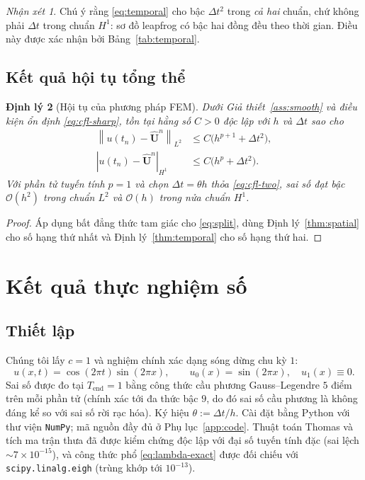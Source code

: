 \documentclass[11pt,a4paper]{article}
\theoremstyle{plain}
\newtheorem{theorem}{Định lý}[section]
\theoremstyle{definition}
\theoremstyle{remark}
\newtheorem{remark}[theorem]{Nhận xét}
\newcommand{\Hone}{H^{1}}
\newcommand{\Ltwo}{L^{2}}
\newcommand{\dt}{\Delta t}
\newcommand{\norm}[1]{\left\lVert #1 \right\rVert}
\newcommand{\seminorm}[1]{\left\lvert #1 \right\rvert}
\newcommand{\Uvec}{\bm{U}}
\begin{document}
\begin{remark}
Chú ý rằng \eqref{eq:temporal} cho bậc $\dt^{2}$ trong \emph{cả hai} chuẩn,
chứ không phải $\dt$ trong chuẩn $\Hone$: sơ đồ leapfrog có bậc hai đồng đều
theo thời gian. Điều này được xác nhận bởi Bảng~\ref{tab:temporal}.
\end{remark}

\subsection{Kết quả hội tụ tổng thể}

\begin{theorem}[Hội tụ của phương pháp FEM]
\label{thm:total}
Dưới Giả thiết~\ref{ass:smooth} và điều kiện ổn định \eqref{eq:cfl-sharp}, tồn tại
hằng số $C > 0$ độc lập với $h$ và $\dt$ sao cho
\begin{align}
  \norm{u(t_{n}) - \hat{\Uvec}^{n}}_{\Ltwo}
    &\le C\bigl( h^{p+1} + \dt^{2} \bigr), \label{eq:total-l2}\\
  \seminorm{u(t_{n}) - \hat{\Uvec}^{n}}_{\Hone}
    &\le C\bigl( h^{p} + \dt^{2} \bigr). \label{eq:total-h1}
\end{align}
Với phần tử tuyến tính $p = 1$ và chọn $\dt = \theta h$ thỏa
\eqref{eq:cfl-two}, sai số đạt bậc $\mathcal{O}(h^{2})$ trong chuẩn $\Ltwo$
và $\mathcal{O}(h)$ trong nửa chuẩn $\Hone$.
\end{theorem}

\begin{proof}
Áp dụng bất đẳng thức tam giác cho \eqref{eq:split}, dùng
Định lý~\ref{thm:spatial} cho số hạng thứ nhất và Định lý~\ref{thm:temporal} cho số hạng
thứ hai.
\end{proof}

\section{Kết quả thực nghiệm số}
\label{sec:thucnghiem}

\subsection{Thiết lập}

Chúng tôi lấy $c = 1$ và nghiệm chính xác dạng sóng dừng chu kỳ $1$:
\begin{equation}
\label{eq:exact}
  u(x,t) = \cos(2\pi t)\sin(2\pi x),
  \qquad u_{0}(x) = \sin(2\pi x),\quad u_{1}(x) \equiv 0 .
\end{equation}
Sai số được đo tại $T_{\mathrm{end}} = 1$ bằng công thức cầu phương
Gauss--Legendre $5$ điểm trên mỗi phần tử (chính xác tới đa thức bậc $9$, do
đó sai số cầu phương là không đáng kể so với sai số rời rạc hóa). Ký hiệu
$\theta := \dt/h$. Cài đặt bằng Python với thư viện \texttt{NumPy}; mã nguồn
đầy đủ ở Phụ lục~\ref{app:code}. Thuật toán Thomas và tích ma trận thưa đã được
kiểm chứng độc lập với đại số tuyến tính đặc (sai lệch
$\sim 7\times 10^{-15}$), và công thức phổ \eqref{eq:lambda-exact} được đối
chiếu với \texttt{scipy.linalg.eigh} (trùng khớp tới $10^{-13}$).
\end{document}
